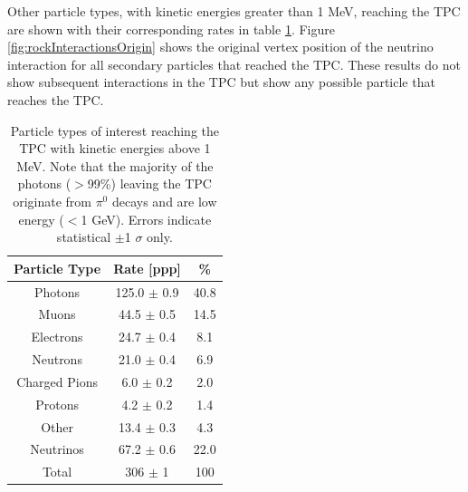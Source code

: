 Other particle types, with kinetic energies greater than 1 MeV, reaching the TPC are shown with their corresponding rates in table \ref{tab:inFluxParticles}. Figure \ref{fig:rockInteractionsOrigin} shows the original vertex position of the neutrino interaction for all secondary particles that reached the TPC. These results do not show subsequent interactions in the TPC but show any possible particle that reaches the TPC.
\begin{table}[htbp]
\centering
\begin{tabular}{ccc}
	\hline
	 \textbf{Particle Type} & \textbf{Rate [ppp]} & \textbf{\%} \\
	 \hline
	 Photons & 125.0 $\pm$ 0.9 & 40.8\\
	 Muons & 44.5 $\pm$ 0.5 & 14.5\\
	 Electrons & 24.7 $\pm$ 0.4 & 8.1\\
	 Neutrons & 21.0 $\pm$ 0.4 & 6.9\\
	 Charged Pions & 6.0 $\pm$ 0.2 & 2.0\\
	 Protons & 4.2 $\pm$ 0.2 & 1.4\\
	 Other & 13.4 $\pm$ 0.3 & 4.3\\
	 \hline
	 Neutrinos & 67.2 $\pm$ 0.6 & 22.0 \\
	 \hline
	 \hline
	 Total & 306 $\pm$ 1 & 100 \\
	\hline
\end{tabular}
\caption{Particle types of interest reaching the TPC with kinetic energies above 1 MeV. Note that the majority of the photons ($>$99\%) leaving the TPC originate from $\pi^{0}$ decays and are low energy ($<$1 GeV). Errors indicate statistical $\pm$1 $\sigma$ only.}
\label{tab:inFluxParticles}
\end{table}


